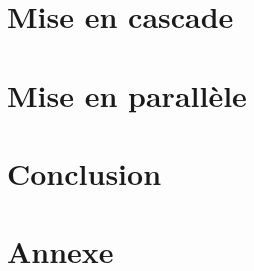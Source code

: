 \documentclass[12,french]{report}
\begin{document}
\chapter{Mise en cascade}


\chapter{Mise en parallèle}


\chapter*{Conclusion}



\chapter*{Annexe}
\end{document}
